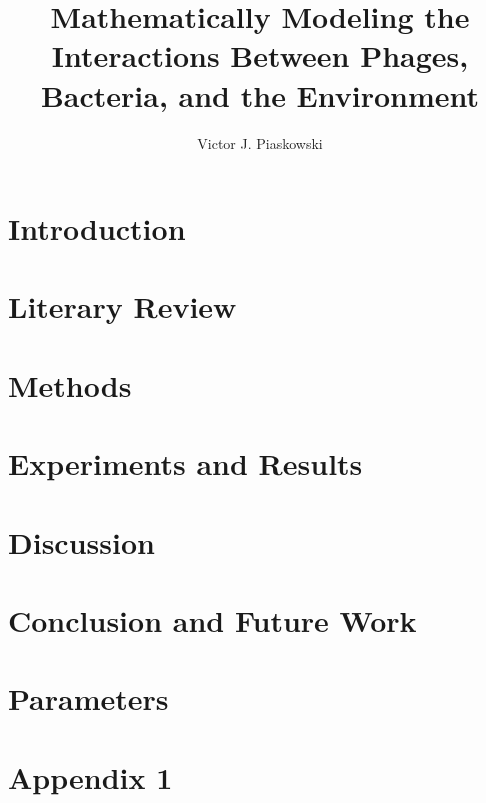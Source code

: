 \documentclass[titlepage]{article}
\begin{document}
\title{Mathematically Modeling the Interactions Between Phages,  Bacteria, and the Environment}
\author{Victor J. Piaskowski}
\maketitle
\begin{abstract}
    
\end{abstract}
\newpage


\newpage

\tableofcontents
\newpage 
{}
\section{Introduction}
\label{sec:Introduction}

\newpage

\section{Literary Review}
\label{sec:Literature}

\newpage

\section{Methods}
\label{sec:Methods}

\newpage

\section{Experiments and Results}
    \label{sec:Experiments}
    
    \newpage

\section{Discussion}
    \label{sec:Discussion}
    
    \newpage

\section{Conclusion and Future Work}
    \label{sec:Conclusion}
    
    \newpage
\printbibliography[heading=bibintoc, title={References}]
\newpage

\appendix 
\section{Parameters}
    \label{sec:Parameters}
    
    \newpage

\section{Appendix 1}
    \label{sec:Appendix1}
    
    \newpage
\end{document}
